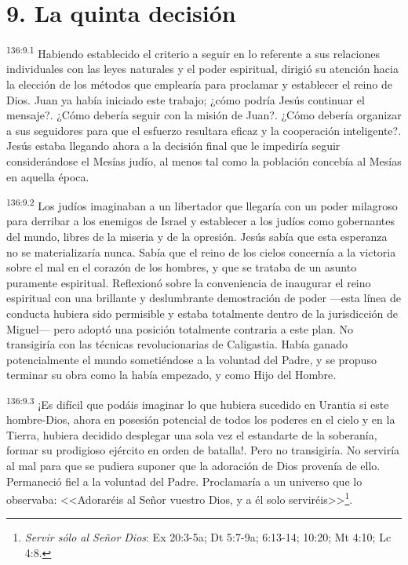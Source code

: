 \section*{9. La quinta decisión}
\par 
\textsuperscript{136:9.1} Habiendo establecido el criterio a seguir en lo referente a sus relaciones individuales con las leyes naturales y el poder espiritual, dirigió su atención hacia la elección de los métodos que emplearía para proclamar y establecer el reino de Dios. Juan ya había iniciado este trabajo; ¿cómo podría Jesús continuar el mensaje?. ¿Cómo debería seguir con la misión de Juan?. ¿Cómo debería organizar a sus seguidores para que el esfuerzo resultara eficaz y la cooperación inteligente?. Jesús estaba llegando ahora a la decisión final que le impediría seguir considerándose el Mesías judío, al menos tal como la población concebía al Mesías en aquella época.

\par 
\textsuperscript{136:9.2} Los judíos imaginaban a un libertador que llegaría con un poder milagroso para derribar a los enemigos de Israel y establecer a los judíos como gobernantes del mundo, libres de la miseria y de la opresión. Jesús sabía que esta esperanza no se materializaría nunca. Sabía que el reino de los cielos concernía a la victoria sobre el mal en el corazón de los hombres, y que se trataba de un asunto puramente espiritual. Reflexionó sobre la conveniencia de inaugurar el reino espiritual con una brillante y deslumbrante demostración de poder ---esta línea de conducta hubiera sido permisible y estaba totalmente dentro de la jurisdicción de Miguel--- pero adoptó una posición totalmente contraria a este plan. No transigiría con las técnicas revolucionarias de Caligastia. Había ganado potencialmente el mundo sometiéndose a la voluntad del Padre, y se propuso terminar su obra como la había empezado, y como Hijo del Hombre.

\par 
\textsuperscript{136:9.3} ¡Es difícil que podáis imaginar lo que hubiera sucedido en Urantia si este hombre-Dios, ahora en posesión potencial de todos los poderes en el cielo y en la Tierra, hubiera decidido desplegar una sola vez el estandarte de la soberanía, formar su prodigioso ejército en orden de batalla!. Pero no transigiría. No serviría al mal para que se pudiera suponer que la adoración de Dios provenía de ello. Permaneció fiel a la voluntad del Padre. Proclamaría a un universo que lo observaba: <<Adoraréis al Señor vuestro Dios, y a él solo serviréis>>\footnote{\textit{Servir sólo al Señor Dios}: Ex 20:3-5a; Dt 5:7-9a; 6:13-14; 10:20; Mt 4:10; Lc 4:8.}.

